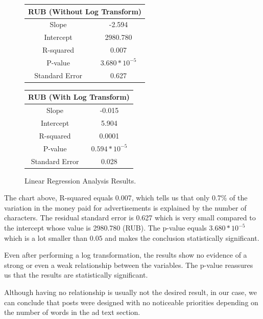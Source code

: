 \documentclass{article}
\begin{document}
\bigskip

\begin{figure}[H]
  \centering
  \begin{tabular}{*{2}{c}}
    \toprule
    \multicolumn{2}{c}{RUB (Without Log Transform)}\\
    \midrule
    Slope          & -2.594\\
    \midrule
    Intercept      & 2980.780\\
    \midrule
    R-squared      & 0.007\\
    \midrule
    P-value        & $3.680 * 10^{-5}$\\
    \midrule
    Standard Error & 0.627\\
    \bottomrule
  \end{tabular}
  \quad
  \begin{tabular}{*{2}{c}}
    \toprule
    \multicolumn{2}{c}{RUB (With Log Transform)}\\
    \midrule
    Slope          & -0.015\\
    \midrule
    Intercept      & 5.904\\
    \midrule
    R-squared      & 0.0001\\
    \midrule
    P-value        & $0.594 * 10^{-5}$\\
    \midrule
    Standard Error & 0.028\\
    \bottomrule
  \end{tabular}
  \caption{Linear Regression Analysis Results.}
\end{figure}

The chart above, R-squared equals 0.007, which tells us that only 0.7\%
of the variation in the money paid for advertisements is explained by the
number of characters. The residual standard error is 0.627 which is very small
compared to the intercept whose value is 2980.780 (RUB). The p-value equals
$3.680 * 10^{-5}$ which is a lot smaller than $0.05$ and makes the conclusion
statistically significant.

\bigskip

Even after performing a log transformation, the results show no evidence of a
strong or even a weak relationship between the variables. The p-value reassures
us that the results are statistically significant.

\bigskip

Although having no relationship is usually not the desired result, in our case,
we can conclude that posts were designed with no noticeable priorities
depending on the number of words in the ad text section.
\end{document}
